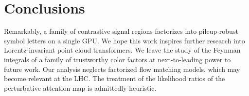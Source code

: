 \section{Conclusions}\label{sec:conclusions}

Remarkably, a family of contrastive signal regions factorizes into
pileup-robust symbol letters on a single GPU. We hope this work inspires
further research into Lorentz-invariant point cloud transformers. We
leave the study of the Feynman integrals of a family of trustworthy
color factors at next-to-leading power to future work. Our analysis
neglects factorized flow matching models, which may become relevant at
the LHC. The treatment of the likelihood ratios of the perturbative
attention map is admittedly heuristic.

